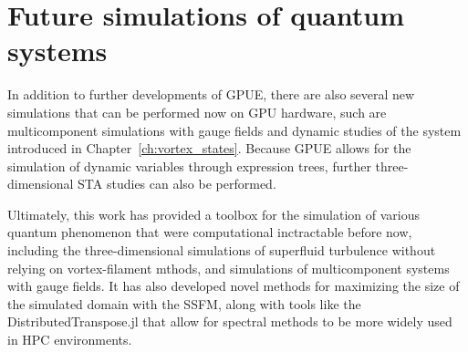 \section{Future simulations of quantum systems}

In addition to further developments of GPUE, there are also several new simulations that can be performed now on GPU hardware, such are multicomponent simulations with gauge fields and dynamic studies of the system introduced in Chapter~\ref{ch:vortex_states}.
Because GPUE allows for the simulation of dynamic variables through expression trees, further three-dimensional STA studies can also be performed.

Ultimately, this work has provided a toolbox for the simulation of various quantum phenomenon that were computational inctractable before now, including the three-dimensional simulations of superfluid turbulence without relying on vortex-filament mthods, and simulations of multicomponent systems with gauge fields.
It has also developed novel methods for maximizing the size of the simulated domain with the SSFM, along with tools like the DistributedTranspose.jl that allow for spectral methods to be more widely used in HPC environments.
